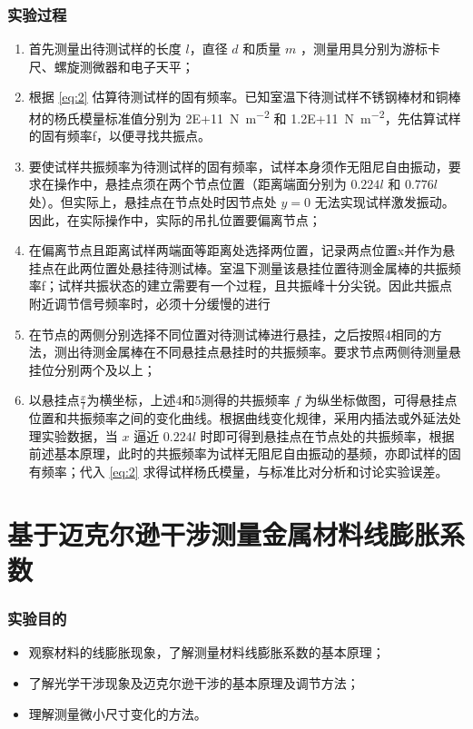 \documentclass[a4paper,utf8]{article}
\begin{document}
\section{实验过程}%
    \begin{enumerate}
        \item 首先测量出待测试样的长度 $l$，直径 $d$ 和质量 $m$ ，测量用具分别为游标卡尺、螺旋测微器和电子天平；
        \item 根据 \eqref{eq:2} 估算待测试样的固有频率。已知室温下待测试样不锈钢棒材和铜棒材的杨氏模量标准值分别为 \SI{2E+11}{\N\per\m^2} 和 \SI{1.2E+11}{\N\per\m^2}，先估算试样的固有频率f，以便寻找共振点。
        \item 要使试样共振频率为待测试样的固有频率，试样本身须作无阻尼自由振动，要求在操作中，悬挂点须在两个节点位置（距离端面分别为 $0.224l$ 和 $0.776l$ 处）。但实际上，悬挂点在节点处时因节点处 $y=0$ 无法实现试样激发振动。因此，在实际操作中，实际的吊扎位置要偏离节点；
        \item 在偏离节点且距离试样两端面等距离处选择两位置，记录两点位置x并作为悬挂点在此两位置处悬挂待测试棒。室温下测量该悬挂位置待测金属棒的共振频率f；试样共振状态的建立需要有一个过程，且共振峰十分尖锐。因此共振点附近调节信号频率时，必须十分缓慢的进行
        \item 在节点的两侧分别选择不同位置对待测试棒进行悬挂，之后按照4相同的方法，测出待测金属棒在不同悬挂点悬挂时的共振频率。要求节点两侧待测量悬挂位分别两个及以上；
        \item 以悬挂点$\frac{x}{l}$为横坐标，上述4和5测得的共振频率 $f$ 为纵坐标做图，可得悬挂点位置和共振频率之间的变化曲线。根据曲线变化规律，采用内插法或外延法处理实验数据，当 $x$ 逼近 $0.224l$ 时即可得到悬挂点在节点处的共振频率，根据前述基本原理，此时的共振频率为试样无阻尼自由振动的基频，亦即试样的固有频率；代入 \eqref{eq:2} 求得试样杨氏模量，与标准比对分析和讨论实验误差。 
    \end{enumerate}
\newpage
\part{基于迈克尔逊干涉测量金属材料线膨胀系数}
\setcounter{section}{0}
\section{实验目的}
    \begin{itemize}
        \item 观察材料的线膨胀现象，了解测量材料线膨胀系数的基本原理；
        \item 了解光学干涉现象及迈克尔逊干涉的基本原理及调节方法； 
        \item 理解测量微小尺寸变化的方法。
    \end{itemize}
\end{document}
